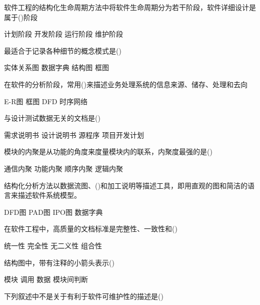 \documentclass[answers]{exam}
\begin{document}
\begin{questions}
	\question 软件工程的结构化生命周期方法中将软件生命周期分为若干阶段，软件详细设计是属于()阶段\\
	\begin{oneparchoices}
		\choice 计划阶段
		\choice 开发阶段
		\choice 运行阶段
		\choice 维护阶段
	\end{oneparchoices}
	\question 最适合于记录各种细节的概念模式是()\\
	\begin{oneparchoices}
		\choice 实体关系图
		\choice 数据字典
		\choice 结构图
		\choice 框图
	\end{oneparchoices}
	\question 在软件的分析阶段，常用()来描述业务处理系统的信息来源、储存、处理和去向\\
	\begin{oneparchoices}
		\choice E-R图
		\choice 框图
		\choice DFD
		\choice 时序网络
	\end{oneparchoices}
	\question 与设计测试数据无关的文档是()\\
	\begin{oneparchoices}
		\choice 需求说明书
		\choice 设计说明书
		\choice 源程序
		\choice 项目开发计划
	\end{oneparchoices}
	\question 模块的内聚是从功能的角度来度量模块内的联系，内聚度最强的是()\\
	\begin{oneparchoices}
		\choice 通信内聚
		\choice 功能内聚
		\choice 顺序内聚
		\choice 逻辑内聚
	\end{oneparchoices}
	\question 结构化分析方法以数据流图、()和加工说明等描述工具，即用直观的图和简洁的语言来描述软件系统模型。\\
	\begin{oneparchoices}
		\choice DFD图
		\choice PAD图
		\choice IPO图
		\choice 数据字典
	\end{oneparchoices}
	\question 在软件工程中，高质量的文档标准是完整性、一致性和()\\
	\begin{oneparchoices}
		\choice 统一性
		\choice 完全性
		\choice 无二义性
		\choice 组合性
	\end{oneparchoices}
	\question 结构图中，带有注释的小箭头表示()\\
	\begin{oneparchoices}
		\choice 模块
		\choice 调用
		\choice 数据
		\choice 模块间判断
	\end{oneparchoices}
	\question 下列叙述中不是关于有利于软件可维护性的描述是()\\
	\begin{oneparchoices}

\end{oneparchoices}
\end{questions}
\end{document}
